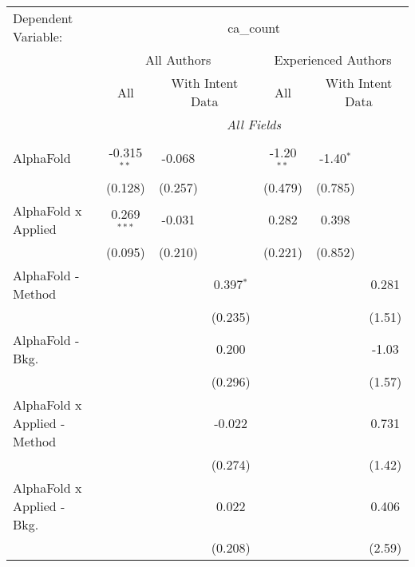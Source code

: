 \begingroup
\centering
\begin{tabular}{lcccccc}
   \tabularnewline \midrule \midrule
   Dependent Variable: & \multicolumn{6}{c}{ca\_count}\\
 & \multicolumn{3}{c}{All Authors} & \multicolumn{3}{c}{Experienced Authors} \\
\cmidrule(lr){2-4} \cmidrule(lr){5-7}
 & \multicolumn{1}{c}{All} & \multicolumn{2}{c}{With Intent Data} & \multicolumn{1}{c}{All} & \multicolumn{2}{c}{With Intent Data} \\
\cmidrule(lr){2-2} \cmidrule(lr){3-4} \cmidrule(lr){5-5} \cmidrule(lr){6-7}
 & \multicolumn{6}{c}{\textit{All Fields}} \\ \\
   AlphaFold                      & -0.315$^{**}$ & -0.068  &               & -1.20$^{**}$   & -1.40$^{*}$ &   \\   
                                  & (0.128)       & (0.257) &               & (0.479)        & (0.785)     &   \\   
   AlphaFold x Applied            & 0.269$^{***}$ & -0.031  &               & 0.282          & 0.398       &   \\   
                                  & (0.095)       & (0.210) &               & (0.221)        & (0.852)     &   \\   
   AlphaFold - Method             &               &         & 0.397$^{*}$   &                &             & 0.281\\   
                                  &               &         & (0.235)       &                &             & (1.51)\\   
   AlphaFold - Bkg.               &               &         & 0.200         &                &             & -1.03\\   
                                  &               &         & (0.296)       &                &             & (1.57)\\   
   AlphaFold x Applied - Method   &               &         & -0.022        &                &             & 0.731\\   
                                  &               &         & (0.274)       &                &             & (1.42)\\   
   AlphaFold x Applied - Bkg.     &               &         & 0.022         &                &             & 0.406\\   
                                  &               &         & (0.208)       &                &             & (2.59)\\   

\end{tabular}
